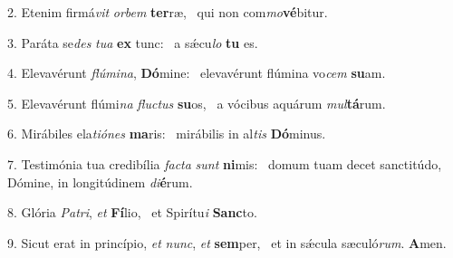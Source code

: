 2. Etenim firmá\textit{vit} \textit{or}\textit{bem} \textbf{ter}ræ, \ast\  qui non com\textit{mo}\textbf{vé}bitur.\

3. Paráta se\textit{des} \textit{tu}\textit{a} \textbf{ex} tunc: \ast\  a sǽcu\textit{lo} \textbf{tu} es.\

4. Elevavérunt \textit{flú}\textit{mi}\textit{na}, \textbf{Dó}mine: \ast\  elevavérunt flúmina vo\textit{cem} \textbf{su}am.\

5. Elevavérunt flúmi\textit{na} \textit{fluc}\textit{tus} \textbf{su}os, \ast\  a vócibus aquárum \textit{mul}\textbf{tá}rum.\

6. Mirábiles ela\textit{ti}\textit{ó}\textit{nes} \textbf{ma}ris: \ast\  mirábilis in al\textit{tis} \textbf{Dó}minus.\

7. Testimónia tua credibília \textit{fac}\textit{ta} \textit{sunt} \textbf{ni}mis: \ast\  domum tuam decet sanctitúdo, Dómine, in longitúdinem \textit{di}\textbf{é}rum.\

8. Glória \textit{Pa}\textit{tri}, \textit{et} \textbf{Fí}lio, \ast\  et Spirítu\textit{i} \textbf{Sanc}to.\

9. Sicut erat in princípio, \textit{et} \textit{nunc}, \textit{et} \textbf{sem}per, \ast\  et in sǽcula sæculó\textit{rum}. \textbf{A}men.\

